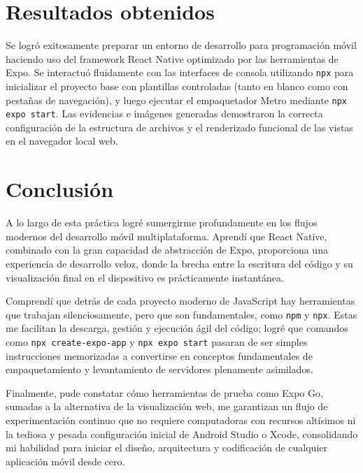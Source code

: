 \documentclass[12pt,a4paper]{article}
\begin{document}
\section{Resultados obtenidos}
Se logró exitosamente preparar un entorno de desarrollo para programación móvil haciendo uso del framework React Native optimizado por las herramientas de Expo. Se interactuó fluidamente con las interfaces de consola utilizando \texttt{npx} para inicializar el proyecto base con plantillas controladas (tanto en blanco como con pestañas de navegación), y luego ejecutar el empaquetador Metro mediante \texttt{npx expo start}. Las evidencias e imágenes generadas demostraron la correcta configuración de la estructura de archivos y el renderizado funcional de las vistas en el navegador local web.

\section{Conclusión}
A lo largo de esta práctica logré sumergirme profundamente en los flujos modernos del desarrollo móvil multiplataforma. Aprendí que React Native, combinado con la gran capacidad de abstracción de Expo, proporciona una experiencia de desarrollo veloz, donde la brecha entre la escritura del código y su visualización final en el dispositivo es prácticamente instantánea. 

Comprendí que detrás de cada proyecto moderno de JavaScript hay herramientas que trabajan silenciosamente, pero que son fundamentales, como \texttt{npm} y \texttt{npx}. Estas me facilitan la descarga, gestión y ejecución ágil del código; logré que comandos como \texttt{npx create-expo-app} y \texttt{npx expo start} pasaran de ser simples instrucciones memorizadas a convertirse en conceptos fundamentales de empaquetamiento y levantamiento de servidores plenamente asimilados.

Finalmente, pude constatar cómo herramientas de prueba como Expo Go, sumadas a la alternativa de la visualización web, me garantizan un flujo de experimentación continuo que no requiere computadoras con recursos altísimos ni la tediosa y pesada configuración inicial de Android Studio o Xcode, consolidando mi habilidad para iniciar el diseño, arquitectura y codificación de cualquier aplicación móvil desde cero.
\end{document}
